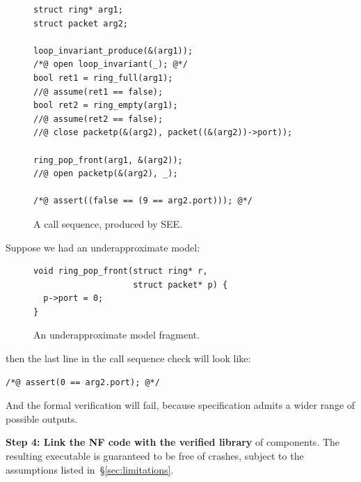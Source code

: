 \documentclass[letterpaper,twocolumn,10pt]{article}
\newcommand{\code}[1]{\lstinline{#1}}
\begin{document}
\begin{figure}[h!]
\begin{lstlisting}
struct ring* arg1;
struct packet arg2;

loop_invariant_produce(&(arg1));
/*@ open loop_invariant(_); @*/
bool ret1 = ring_full(arg1);
//@ assume(ret1 == false);
bool ret2 = ring_empty(arg1);
//@ assume(ret2 == false);
//@ close packetp(&(arg2), packet((&(arg2))->port));

ring_pop_front(arg1, &(arg2));
//@ open packetp(&(arg2), _);

/*@ assert((false == (9 == arg2.port))); @*/
\end{lstlisting}
  \caption{A call sequence, produced by SEE.}
  \label{lst:call-sequence}
\end{figure}

Suppose we had an underapproximate model:
\begin{figure}[h!]
\begin{lstlisting}
void ring_pop_front(struct ring* r,
                    struct packet* p) {
  p->port = 0;
}
\end{lstlisting}
  \caption{An underapproximate model fragment.}
  \label{lst:underapproximate}
\end{figure}
then the last line in the call sequence check will look like:
\begin{lstlisting}
/*@ assert(0 == arg2.port); @*/
\end{lstlisting}
And the formal verification will fail, because specification admits a wider
range of possible outputs.

{\bf Step 4: Link the NF code with the verified library} of components. The resulting executable is guaranteed to be free of crashes, subject to the assumptions listed in~\S\ref{sec:limitations}.

\end{document}
